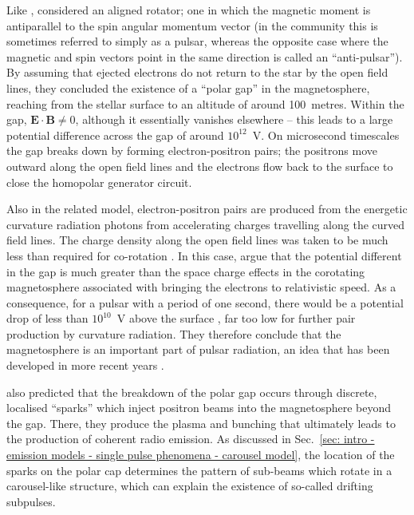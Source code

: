 Like \citet{GJxx1969}, \citet{RSxx1975} considered an aligned rotator; one in which the magnetic moment is antiparallel to the spin angular momentum vector (in the community this is sometimes referred to simply as a pulsar, whereas the opposite case where the magnetic and spin vectors point in the same direction is called an ``anti-pulsar''). By assuming that ejected electrons do not return to the star by the open field lines, they concluded the existence of a ``polar gap'' in the magnetosphere, reaching from the stellar surface to an altitude of around 100~metres. Within the gap, $\mathbf{E}\cdot\mathbf{B} \neq 0$, although it essentially vanishes elsewhere -- this leads to a large potential difference across the gap of around $10^{12}$~V. On microsecond timescales the gap breaks down by forming electron-positron pairs; the positrons move outward along the open field lines and the electrons flow back to the surface to close the homopolar generator circuit.

Also in the related \citet{Sxxx1971} model, electron-positron pairs are produced from the energetic curvature radiation photons from accelerating charges travelling along the curved field lines. The charge density along the open field lines was taken to be much less than required for co-rotation \citet{GJxx1969}. In this case, \citet{RSxx1975} argue that the potential different in the gap is much greater than the space charge effects in the corotating magnetosphere associated with bringing the electrons to relativistic speed. As a consequence, for a pulsar with a period of one second, there would be a potential drop of less than $10^{10}$~V above the surface \citep{Mxxx1974}, far too low for further pair production by curvature radiation. They therefore conclude that the magnetosphere is an important part of pulsar radiation, an idea that has been developed in more recent years \citep[e.g.][]{CRxx1980,ZQHx1997a,Txxx2010, SMGx2015}.


\citet{RSxx1975} also predicted that the breakdown of the polar gap occurs through discrete, localised ``sparks'' which inject positron beams into the magnetosphere beyond the gap. There, they produce the plasma and bunching that ultimately leads to the production of coherent radio emission. As discussed in Sec.~\ref{sec: intro - emission models - single pulse phenomena - carousel model}, the location of the sparks on the polar cap determines the pattern of sub-beams which rotate in a carousel-like structure, which can explain the existence of so-called drifting subpulses.



